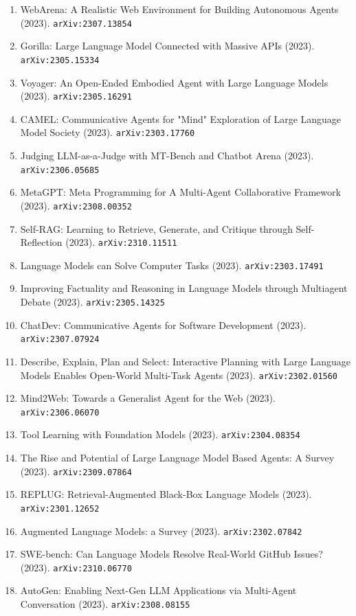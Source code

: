 \documentclass[11pt]{article}
\begin{document}
\begin{enumerate}
  Face (2023). \texttt{arXiv:2303.17580}
  \item WebArena: A Realistic Web Environment for Building Autonomous Agents (2023). \texttt{arXiv:2307.13854}
  \item Gorilla: Large Language Model Connected with Massive APIs (2023). \texttt{arXiv:2305.15334}
  \item Voyager: An Open-Ended Embodied Agent with Large Language Models (2023). \texttt{arXiv:2305.16291}
  \item CAMEL: Communicative Agents for "Mind" Exploration of Large Language
  Model Society (2023). \texttt{arXiv:2303.17760}
  \item Judging LLM-as-a-Judge with MT-Bench and Chatbot Arena (2023). \texttt{arXiv:2306.05685}
  \item MetaGPT: Meta Programming for A Multi-Agent Collaborative Framework (2023). \texttt{arXiv:2308.00352}
  \item Self-RAG: Learning to Retrieve, Generate, and Critique through
  Self-Reflection (2023). \texttt{arXiv:2310.11511}
  \item Language Models can Solve Computer Tasks (2023). \texttt{arXiv:2303.17491}
  \item Improving Factuality and Reasoning in Language Models through Multiagent
  Debate (2023). \texttt{arXiv:2305.14325}
  \item ChatDev: Communicative Agents for Software Development (2023). \texttt{arXiv:2307.07924}
  \item Describe, Explain, Plan and Select: Interactive Planning with Large
  Language Models Enables Open-World Multi-Task Agents (2023). \texttt{arXiv:2302.01560}
  \item Mind2Web: Towards a Generalist Agent for the Web (2023). \texttt{arXiv:2306.06070}
  \item Tool Learning with Foundation Models (2023). \texttt{arXiv:2304.08354}
  \item The Rise and Potential of Large Language Model Based Agents: A Survey (2023). \texttt{arXiv:2309.07864}
  \item REPLUG: Retrieval-Augmented Black-Box Language Models (2023). \texttt{arXiv:2301.12652}
  \item Augmented Language Models: a Survey (2023). \texttt{arXiv:2302.07842}
  \item SWE-bench: Can Language Models Resolve Real-World GitHub Issues? (2023). \texttt{arXiv:2310.06770}
  \item AutoGen: Enabling Next-Gen LLM Applications via Multi-Agent Conversation (2023). \texttt{arXiv:2308.08155}

\end{enumerate}
\end{document}
